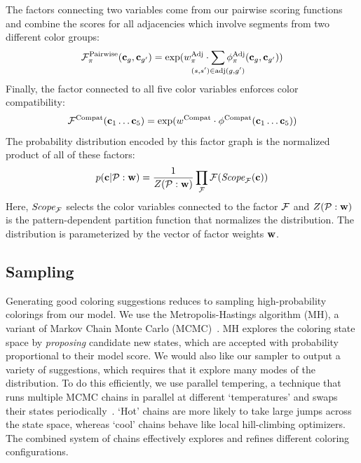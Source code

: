 The factors connecting two variables come from our pairwise scoring functions and combine the scores for all adjacencies which involve segments from two different color groups:
\begin{equation*}
\factor^{\textrm{Pairwise}}_\prop(\colors_\group, \colors_\groupprime) =
	\exp( \adjTermWeight \cdot \sum_{\mathclap{(\segment, \segprime) \in \adj(\group, \groupprime)}} \adjInstStats( \colors_\group, \colors_\groupprime))
\end{equation*}
Finally, the factor connected to all five color variables enforces color compatibility:
\begin{equation*}
\mathcal{F}^{\textrm{Compat}}(\mathbf{c}_1 \ldots \mathbf{c}_5) = \exp(w^{\textrm{Compat}} \cdot \phi^{\textrm{Compat}}(\mathbf{c}_1 \ldots \mathbf{c}_5))
\end{equation*}
The probability distribution encoded by this factor graph is the normalized product of all of these factors:
\begin{equation*}
p(\mathbf{c} | \mathcal{P} : \mathbf{w}) = \frac{1}{Z(\mathcal{P} : \mathbf{w})} \prod_{\mathcal{F}} \mathcal{F}(\textit{Scope}_{\mathcal{F}}(\mathbf{c}))
\end{equation*}
Here, $\textit{Scope}_{\mathcal{F}}$ selects the color variables connected to the factor $\mathcal{F}$ and $Z(\mathcal{P} : \mathbf{w})$ is the pattern-dependent partition function that normalizes the distribution. The distribution is parameterized by the vector of factor weights $\mathbf{w}$.


\subsection{Sampling}
\label{sec:sampling}

Generating good coloring suggestions reduces to sampling high-probability colorings from our model. We use the Metropolis-Hastings algorithm (MH), a variant of Markov Chain Monte Carlo (MCMC)~\cite{Metropolis,Hastings}. MH explores the coloring state space by \emph{proposing} candidate new states, which are accepted with probability proportional to their model score. We would also like our sampler to output a variety of suggestions, which requires that it explore many modes of the distribution. To do this efficiently, we use parallel tempering, a technique that runs multiple MCMC chains in parallel at different `temperatures' and swaps their states periodically~\cite{ParallelTempering}. `Hot' chains are more likely to take large jumps across the state space, whereas `cool' chains behave like local hill-climbing optimizers. The combined system of chains effectively explores and refines different coloring configurations.

